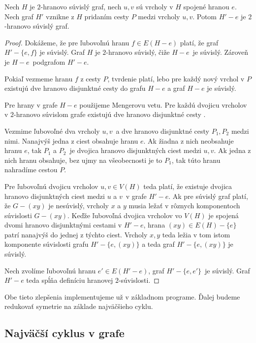 \begin{lema}
    Nech $H$ je $2$-hranovo súvislý graf, nech $u, v$ sú vrcholy v $H$ spojené hranou $e$.
    Nech graf $H'$ vznikne z $H$ pridaním cesty $P$ medzi vrcholy $u, v$. Potom $H' - e$ je
    $2$-hranovo súvislý graf.
\end{lema}
\begin{proof}
    Dokážeme, že pre ľubovoľnú hranu $f \in E(H - e)$ platí, že graf $H' - \{e, f\}$ je súvislý.
    Graf $H$ je $2$-hranovo súvislý, čiže $H - e$ je súvislý. Zároveň je $H - e$ podgrafom
    $H' - e$.
    
    Pokiaľ vezmeme hranu $f$ z cesty $P$, tvrdenie platí, lebo pre každý nový vrchol v $P$
    existujú dve hranovo disjunktné cesty do grafu $H - e$ a graf $H - e$ je súvislý. 
    
    Pre hrany v grafe $H - e$ použijeme Mengerovu vetu. Pre každú dvojicu vrcholov
    v $2$-hranovo súvislom grafe existujú dve hranovo disjunktné cesty \cite{diestel_graph}.

    Vezmime ľubovoľné dva vrcholy $u, v$ a dve hranovo disjunktné cesty $P_1, P_2$ medzi nimi.
    Nanajvýš jedna z ciest obsahuje hranu $e$.
    Ak žiadna z nich neobsahuje hranu $e$, tak $P_1$ a $P_2$ je dvojica hranovo disjunktných ciest
    medzi $u, v$. Ak jedna z nich hranu obsahuje, bez ujmy na všeobecnosti je to $P_1$, tak túto hranu
    nahradíme cestou $P$.

    Pre ľubovoľnú dvojicu vrcholov $u, v \in V(H)$ teda platí, že existuje dvojica hranovo disjunktných
    ciest medzi $u$ a $v$ v grafe $H' - e$. Ak pre súvislý graf platí, že $G - (xy)$ je nesúvislý, vrcholy
    $x$ a $y$ musia ležať v rôznych komponentoch súvislosti $G - (xy)$. Keďže ľubovoľná dvojica vrcholov
    vo $V(H)$ je spojená dvomi hranovo disjunktnými cestami v $H' - e$, hrana $(xy) \in E(H) - \{e\}$ patrí
    nanajvýš do jednej z týchto ciest. Vrcholy $x, y$ teda ležia v tom istom komponente súvislosti grafu
    $H' - \{e, (xy)\}$ a teda graf $H' - \{e, (xy)\}$ je súvislý.

    Nech zvolíme ľubovoľnú hranu $e' \in E(H' - e)$, graf $H' - \{e, e'\}$ je súvislý. Graf $H' - e$ teda
    spĺňa definíciu hranovej $2$-súvislosti.
\end{proof}

Obe tieto zlepšenia implementujeme už v základnom programe. Ďalej budeme redukovať symetrie na základe
najväčšieho cyklu.

\subsection{Najväčší cyklus v grafe}

